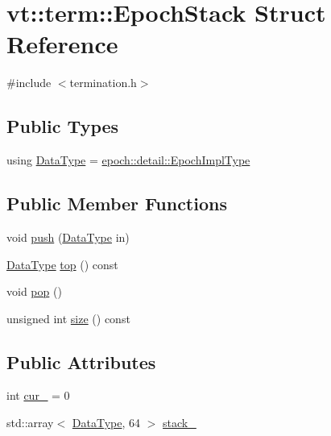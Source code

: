 \hypertarget{structvt_1_1term_1_1_epoch_stack}{}\section{vt\+:\+:term\+:\+:Epoch\+Stack Struct Reference}
\label{structvt_1_1term_1_1_epoch_stack}


{\ttfamily \#include $<$termination.\+h$>$}

\subsection*{Public Types}
\begin{DoxyCompactItemize}
\item 
using \hyperlink{structvt_1_1term_1_1_epoch_stack_a1c8546a8c68578c23ed96e65a778b5dc}{Data\+Type} = \hyperlink{namespacevt_1_1epoch_1_1detail_a9adc5df96a521e516dc20511eb553075}{epoch\+::detail\+::\+Epoch\+Impl\+Type}
\end{DoxyCompactItemize}
\subsection*{Public Member Functions}
\begin{DoxyCompactItemize}
\item 
void \hyperlink{structvt_1_1term_1_1_epoch_stack_abfe65db30a333888871d23958f3fa073}{push} (\hyperlink{structvt_1_1term_1_1_epoch_stack_a1c8546a8c68578c23ed96e65a778b5dc}{Data\+Type} in)
\item 
\hyperlink{structvt_1_1term_1_1_epoch_stack_a1c8546a8c68578c23ed96e65a778b5dc}{Data\+Type} \hyperlink{structvt_1_1term_1_1_epoch_stack_a888020d5f25356fafef0153cfdbd6481}{top} () const
\item 
void \hyperlink{structvt_1_1term_1_1_epoch_stack_a77cd90e40abc0d89d6ebd9e8a7d861cd}{pop} ()
\item 
unsigned int \hyperlink{structvt_1_1term_1_1_epoch_stack_a3d60ab4d1dc2c72c4e321f370976d223}{size} () const
\end{DoxyCompactItemize}
\subsection*{Public Attributes}
\begin{DoxyCompactItemize}
\item 
int \hyperlink{structvt_1_1term_1_1_epoch_stack_a88902e9a1c7702232a7047617f96b1ac}{cur\+\_\+} = 0
\item 
std\+::array$<$ \hyperlink{structvt_1_1term_1_1_epoch_stack_a1c8546a8c68578c23ed96e65a778b5dc}{Data\+Type}, 64 $>$ \hyperlink{structvt_1_1term_1_1_epoch_stack_a6ba9e4683df356f409c8ba27f977a99a}{stack\+\_\+}
\end{DoxyCompactItemize}


